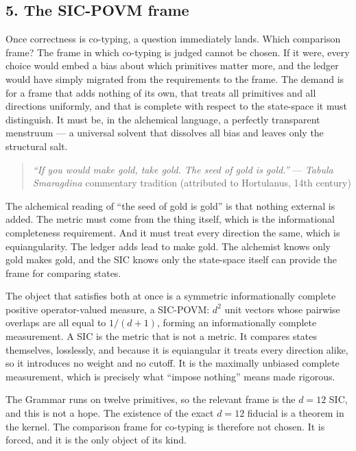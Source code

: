 \hypertarget{the-sic-povm-frame}{%
\subsection{5. The SIC-POVM frame}\label{the-sic-povm-frame}}

Once correctness is co-typing, a question immediately lands. Which
comparison frame? The frame in which co-typing is judged cannot be
chosen. If it were, every choice would embed a bias about which
primitives matter more, and the ledger would have simply migrated from
the requirements to the frame. The demand is for a frame that adds
nothing of its own, that treats all primitives and all directions
uniformly, and that is complete with respect to the state-space it must
distinguish. It must be, in the alchemical language, a perfectly
transparent menstruum --- a universal solvent that dissolves all bias
and leaves only the structural salt.

\begin{quote}
\emph{``If you would make gold, take gold. The seed of gold is gold.''}
--- \emph{Tabula Smaragdina} commentary tradition (attributed to
Hortulanus, 14th century)
\end{quote}

The alchemical reading of ``the seed of gold is gold'' is that nothing
external is added. The metric must come from the thing itself, which is
the informational completeness requirement. And it must treat every
direction the same, which is equiangularity. The ledger adds lead to
make gold. The alchemist knows only gold makes gold, and the SIC knows
only the state-space itself can provide the frame for comparing states.

The object that satisfies both at once is a symmetric informationally
complete positive operator-valued measure, a SIC-POVM: \({d^2}\) unit
vectors whose pairwise overlaps are all equal to \({1/(d+1)}\), forming
an informationally complete measurement. A SIC is the metric that is not
a metric. It compares states themselves, losslessly, and because it is
equiangular it treats every direction alike, so it introduces no weight
and no cutoff. It is the maximally unbiased complete measurement, which
is precisely what ``impose nothing'' means made rigorous.

The Grammar runs on twelve primitives, so the relevant frame is the
\({d=12}\) SIC, and this is not a hope. The existence of the exact
\({d=12}\) fiducial is a theorem in the kernel. The comparison frame for
co-typing is therefore not chosen. It is forced, and it is the only
object of its kind.

